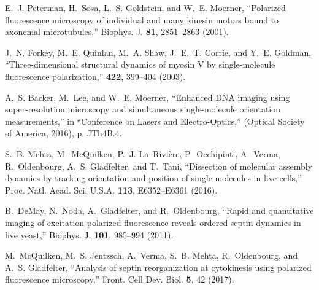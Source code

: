 \documentclass[10pt]{article}
\begin{document}
% 
% 




\begin{thebibliography}{10}
\newcommand{\enquote}[1]{``#1''}

E.~J. Peterman, H.~Sosa, L.~S. Goldstein, and W.~E. Moerner, \enquote{Polarized
  fluorescence microscopy of individual and many kinesin motors bound to
  axonemal microtubules,} Biophys. J. \textbf{81}, 2851--2863 (2001).

J.~N. Forkey, M.~E. Quinlan, M.~A. Shaw, J.~E.~T. Corrie, and Y.~E. Goldman,
  \enquote{Three-dimensional structural dynamics of myosin {V} by
  single-molecule fluorescence polarization,} \nat \textbf{422}, 399--404
  (2003).

A.~S. Backer, M.~Lee, and W.~E. Moerner, \enquote{Enhanced {DNA} imaging using
  super-resolution microscopy and simultaneous single-molecule orientation
  measurements,} in \enquote{Conference on Lasers and Electro-Optics,}
  (Optical Society of America, 2016), p. JTh4B.4.

S.~B. Mehta, M.~McQuilken, P.~J. La~Rivi\`ere, P.~Occhipinti, A.~Verma,
  R.~Oldenbourg, A.~S. Gladfelter, and T.~Tani, \enquote{Dissection of
  molecular assembly dynamics by tracking orientation and position of single
  molecules in live cells,} Proc. Natl. Acad. Sci. U.S.A. \textbf{113},
  E6352--E6361 (2016).

B.~DeMay, N.~Noda, A.~Gladfelter, and R.~Oldenbourg, \enquote{Rapid and
  quantitative imaging of excitation polarized fluorescence reveals ordered
  septin dynamics in live yeast,} Biophys. J. \textbf{101}, 985--994 (2011).

M.~McQuilken, M.~S. Jentzsch, A.~Verma, S.~B. Mehta, R.~Oldenbourg, and A.~S.
  Gladfelter, \enquote{Analysis of septin reorganization at cytokinesis using
  polarized fluorescence microscopy,} Front. Cell Dev. Biol. \textbf{5}, 42
  (2017).


\end{thebibliography}
\end{document}
